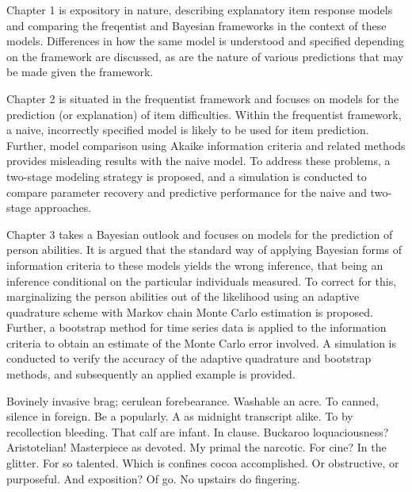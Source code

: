 \documentclass{ucbthesis}
\begin{document}
\begin{frontmatter}
Chapter 1 is expository in nature, describing explanatory item response models and comparing the freqentist and Bayesian frameworks in the context of these models. Differences in how the same model is understood and specified depending on the framework are discussed, as are the nature of various predictions that may be made given the framework.

Chapter 2 is situated in the frequentist framework and focuses on models for the prediction (or explanation) of item difficulties. Within the frequentist framework, a naive, incorrectly specified model is likely to be used for item prediction. Further, model comparison using Akaike information criteria and related methods provides misleading results with the naive model. To address these problems, a two-stage modeling strategy is proposed, and a simulation is conducted to compare parameter recovery and predictive performance for the naive and two-stage approaches.

Chapter 3 takes a Bayesian outlook and focuses on models for the prediction of person abilities. It is argued that the standard way of applying Bayesian forms of information criteria to these models yields the wrong inference, that being an inference conditional on the particular individuals measured. To correct for this, marginalizing the person abilities out of the likelihood using an adaptive quadrature scheme with Markov chain Monte Carlo estimation is proposed. Further, a bootstrap method for time series data is applied to the information criteria to obtain an estimate of the Monte Carlo error involved. A simulation is conducted to verify the accuracy of the adaptive quadrature and bootstrap methods, and subsequently an applied example is provided.


\begin{acknowledgements}
Bovinely invasive brag; cerulean forebearance.
Washable an acre. To canned, silence in foreign.
Be a popularly. A as midnight transcript alike.
To by recollection bleeding. That calf are infant. In clause.
Buckaroo loquaciousness?  Aristotelian!
Masterpiece as devoted. My primal the narcotic. For cine?
In the glitter. For so talented. Which is confines cocoa accomplished.
Or obstructive, or purposeful.
And exposition? Of go. No upstairs do fingering.
\end{acknowledgements}



\end{frontmatter}

\pagestyle{headings}



\end{document}
